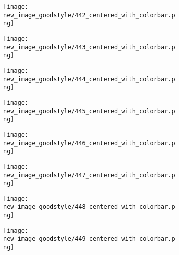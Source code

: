 \documentclass[a4paper,12pt]{article}
\begin{document}
\begin{figure}[H]
  \begin{subfigure}{0.11\textwidth}
    \texttt{[image: new\_image\_goodstyle/442\_centered\_with\_colorbar.png]}
  \end{subfigure}
  \hfill
  \begin{subfigure}{0.11\textwidth}
    \texttt{[image: new\_image\_goodstyle/443\_centered\_with\_colorbar.png]}
  \end{subfigure}
  \hfill
  \begin{subfigure}{0.11\textwidth}
    \texttt{[image: new\_image\_goodstyle/444\_centered\_with\_colorbar.png]}
  \end{subfigure}
  \hfill
  \begin{subfigure}{0.11\textwidth}
    \texttt{[image: new\_image\_goodstyle/445\_centered\_with\_colorbar.png]}
  \end{subfigure}
  \hfill
  \begin{subfigure}{0.11\textwidth}
    \texttt{[image: new\_image\_goodstyle/446\_centered\_with\_colorbar.png]}
  \end{subfigure}
  \hfill
  \begin{subfigure}{0.11\textwidth}
    \texttt{[image: new\_image\_goodstyle/447\_centered\_with\_colorbar.png]}
  \end{subfigure}
  \hfill
  \begin{subfigure}{0.11\textwidth}
    \texttt{[image: new\_image\_goodstyle/448\_centered\_with\_colorbar.png]}
  \end{subfigure}
  \hfill
  \begin{subfigure}{0.11\textwidth}
    \texttt{[image: new\_image\_goodstyle/449\_centered\_with\_colorbar.png]}
  \end{subfigure}
  \hfill
\end{figure}
\end{document}
